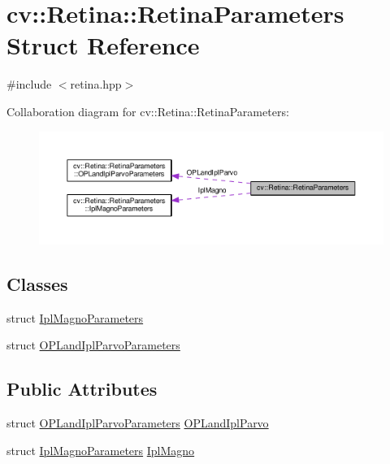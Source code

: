 \hypertarget{structcv_1_1Retina_1_1RetinaParameters}{\section{cv\-:\-:Retina\-:\-:Retina\-Parameters Struct Reference}
\label{structcv_1_1Retina_1_1RetinaParameters}
}


{\ttfamily \#include $<$retina.\-hpp$>$}



Collaboration diagram for cv\-:\-:Retina\-:\-:Retina\-Parameters\-:\nopagebreak
\begin{figure}[H]
\begin{center}
\leavevmode
\includegraphics[width=350pt]{structcv_1_1Retina_1_1RetinaParameters__coll__graph}
\end{center}
\end{figure}
\subsection*{Classes}
\begin{DoxyCompactItemize}
\item 
struct \hyperlink{structcv_1_1Retina_1_1RetinaParameters_1_1IplMagnoParameters}{Ipl\-Magno\-Parameters}
\item 
struct \hyperlink{structcv_1_1Retina_1_1RetinaParameters_1_1OPLandIplParvoParameters}{O\-P\-Land\-Ipl\-Parvo\-Parameters}
\end{DoxyCompactItemize}
\subsection*{Public Attributes}
\begin{DoxyCompactItemize}
\item 
struct \hyperlink{structcv_1_1Retina_1_1RetinaParameters_1_1OPLandIplParvoParameters}{O\-P\-Land\-Ipl\-Parvo\-Parameters} \hyperlink{structcv_1_1Retina_1_1RetinaParameters_af15134145ec98046cb65cd2400d11342}{O\-P\-Land\-Ipl\-Parvo}
\item 
struct \hyperlink{structcv_1_1Retina_1_1RetinaParameters_1_1IplMagnoParameters}{Ipl\-Magno\-Parameters} \hyperlink{structcv_1_1Retina_1_1RetinaParameters_a5de59166febecb714995e2c875e8126a}{Ipl\-Magno}
\end{DoxyCompactItemize}


